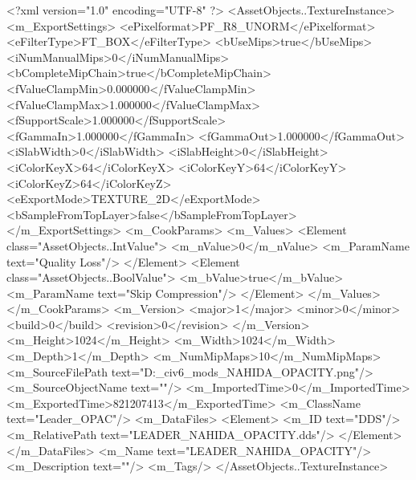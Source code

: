 <?xml version="1.0" encoding="UTF-8" ?>
<AssetObjects..TextureInstance>
	<m_ExportSettings>
		<ePixelformat>PF_R8_UNORM</ePixelformat>
		<eFilterType>FT_BOX</eFilterType>
		<bUseMips>true</bUseMips>
		<iNumManualMips>0</iNumManualMips>
		<bCompleteMipChain>true</bCompleteMipChain>
		<fValueClampMin>0.000000</fValueClampMin>
		<fValueClampMax>1.000000</fValueClampMax>
		<fSupportScale>1.000000</fSupportScale>
		<fGammaIn>1.000000</fGammaIn>
		<fGammaOut>1.000000</fGammaOut>
		<iSlabWidth>0</iSlabWidth>
		<iSlabHeight>0</iSlabHeight>
		<iColorKeyX>64</iColorKeyX>
		<iColorKeyY>64</iColorKeyY>
		<iColorKeyZ>64</iColorKeyZ>
		<eExportMode>TEXTURE_2D</eExportMode>
		<bSampleFromTopLayer>false</bSampleFromTopLayer>
	</m_ExportSettings>
	<m_CookParams>
		<m_Values>
			<Element class="AssetObjects..IntValue">
				<m_nValue>0</m_nValue>
				<m_ParamName text="Quality Loss"/>
			</Element>
			<Element class="AssetObjects..BoolValue">
				<m_bValue>true</m_bValue>
				<m_ParamName text="Skip Compression"/>
			</Element>
		</m_Values>
	</m_CookParams>
	<m_Version>
		<major>1</major>
		<minor>0</minor>
		<build>0</build>
		<revision>0</revision>
	</m_Version>
	<m_Height>1024</m_Height>
	<m_Width>1024</m_Width>
	<m_Depth>1</m_Depth>
	<m_NumMipMaps>10</m_NumMipMaps>
	<m_SourceFilePath text="D:\Documents\GitHub\Uzuki_civ6_mods\Mondstadt\Sumeru\LEADER_NAHIDA_OPACITY.png"/>
	<m_SourceObjectName text=""/>
	<m_ImportedTime>0</m_ImportedTime>
	<m_ExportedTime>821207413</m_ExportedTime>
	<m_ClassName text="Leader_OPAC"/>
	<m_DataFiles>
		<Element>
			<m_ID text="DDS"/>
			<m_RelativePath text="LEADER_NAHIDA_OPACITY.dds"/>
		</Element>
	</m_DataFiles>
	<m_Name text="LEADER_NAHIDA_OPACITY"/>
	<m_Description text=""/>
	<m_Tags/>
</AssetObjects..TextureInstance>

